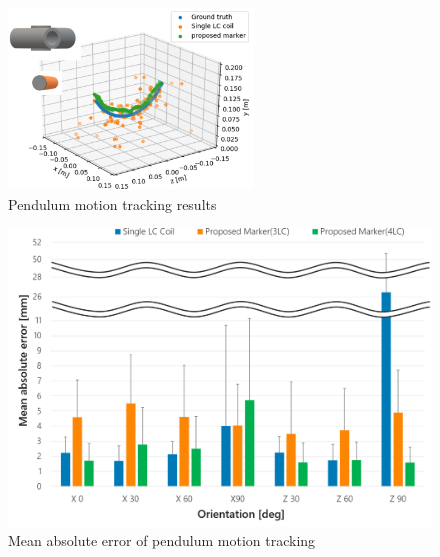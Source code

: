 \documentclass[journal,twoside,web]{ieeecolor}
\begin{document}
\begin{figure}[t]
\begin{minipage}{0.5\hsize}
\begin{center}
  \end{center}
 \end{minipage}
 \begin{minipage}{0.5\hsize}
  \begin{center}
   \centerline{\includegraphics[width=65mm]{figure/pendulum-z90_2.png}}
  \end{center}
 \end{minipage}
 \caption{Pendulum motion tracking results}
 \label{pendulum-tracking}
\end{figure}
 
 \begin{figure}[!t]
    \centerline{\includegraphics[width=\columnwidth]{figure/pendulum_error2.png}}
    \caption{Mean absolute error of pendulum motion tracking}
    \label{pendulum-ave_error}
\end{figure}
\end{document}
